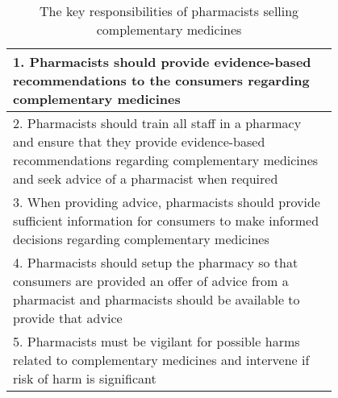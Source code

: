 \begin{table}
\centering
\begin{tabular}{p{0.8\linewidth}}\toprule
1. Pharmacists should provide evidence-based recommendations to the consumers regarding complementary medicines\\[16pt] \midrule
2. Pharmacists should train all staff in a pharmacy and ensure that they provide evidence-based recommendations regarding complementary medicines and seek advice of a pharmacist when required\\[16pt] \midrule
3. When providing advice, pharmacists should provide sufficient information for consumers to make informed decisions regarding complementary medicines\\[16pt] \midrule
4. Pharmacists should setup the pharmacy so that consumers are provided an offer of advice from a pharmacist and pharmacists should be available to provide that advice\\[16pt] \midrule
5. Pharmacists must be vigilant for possible harms related to complementary medicines and intervene if risk of harm is significant\\
\bottomrule
\end{tabular}
\caption{The key responsibilities of pharmacists selling complementary medicines}
\label{responsibilities}
\end{table}
